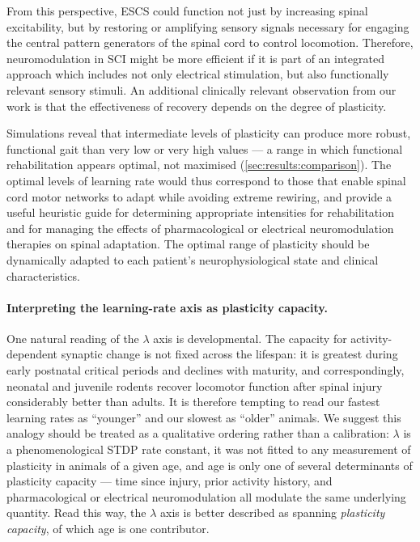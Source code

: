 From this perspective, ESCS could function not just by increasing spinal
excitability, but by restoring or amplifying sensory signals necessary for
engaging the central pattern generators of the spinal cord to control
locomotion. Therefore, neuromodulation in SCI might be more efficient if it
is part of an integrated approach which includes not only electrical
stimulation, but also functionally relevant sensory stimuli. An additional
clinically relevant observation from our work is that the effectiveness of
recovery depends on the degree of plasticity.

Simulations reveal that intermediate levels of plasticity can produce more
robust, functional gait than very low or very high values ---
a range in which functional rehabilitation appears optimal, not maximised
(\autoref{sec:results:comparison}). The optimal levels of learning rate
would thus correspond to those that enable spinal cord motor networks to
adapt while avoiding extreme rewiring, and provide a useful heuristic guide
for determining appropriate intensities for rehabilitation and for
managing the effects of pharmacological or electrical neuromodulation
therapies on spinal adaptation. The optimal range of plasticity should be
dynamically adapted to each patient's neurophysiological state and
clinical characteristics.

\paragraph{Interpreting the learning-rate axis as plasticity capacity.}
One natural reading of the $\lambda$ axis is developmental. The capacity
for activity-dependent synaptic change is not fixed across the lifespan:
it is greatest during early postnatal critical periods and declines with
maturity, and correspondingly, neonatal and juvenile rodents recover
locomotor function after spinal injury considerably better than adults.
It is therefore tempting to read our fastest learning rates as
``younger'' and our slowest as ``older'' animals. We suggest this analogy
should be treated as a qualitative ordering rather than a calibration:
$\lambda$ is a phenomenological STDP rate constant, it was not fitted to
any measurement of plasticity in animals of a given age, and age is only
one of several determinants of plasticity capacity --- time since injury,
prior activity history, and pharmacological or electrical neuromodulation
all modulate the same underlying quantity. Read this way, the $\lambda$
axis is better described as spanning \emph{plasticity capacity}, of which
age is one contributor.

